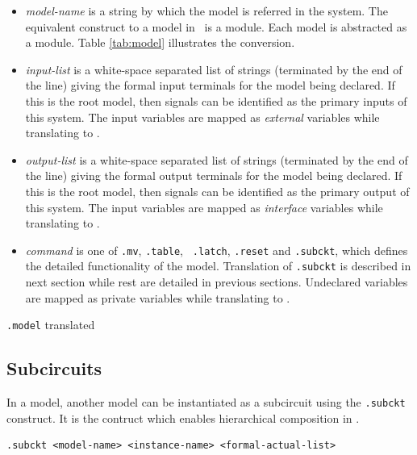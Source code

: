 \begin{itemize}
\item {\em model-name} is a string by which the model is referred
in the system. The equivalent construct to a model in \rm \ is a
module. Each model is abstracted as a module. Table
\ref{tab:model} illustrates the conversion.

\item {\em input-list} is a white-space separated list of strings
(terminated by the end of the line) giving the formal input
terminals for the model being declared. If this is the root model,
then signals can be identified as the primary inputs of this
system. The input variables are mapped as  \emph{external}
variables while translating to {\rm }.

\item {\em output-list} is a white-space separated list of strings
(terminated by the end of the line) giving the formal output
terminals for the model being declared. If this is the root model,
then signals can be identified as the primary output of this
system. The input variables are mapped as \emph{interface}
variables while translating to {\rm }.

\item {\em command} is one of {\tt .mv}, {\tt .table}, {\tt
.latch}, {\tt .reset} and {\tt .subckt}, which defines the
detailed functionality of the model. Translation of {\tt .subckt}
is described in next section while rest are detailed in previous
sections. Undeclared variables are mapped as private variables
while translating to {\rm  }.
\end{itemize}

\begin{table}

\hspace{3em}

\caption{{\tt .model} translated} \label{tab:model}
\end{table}


\subsection{Subcircuits}
In a model, another model can be instantiated as a subcircuit
using the {\tt .subckt} construct. It is the contruct which
enables hierarchical composition in {\mv}.

\begin{verbatim}
.subckt <model-name> <instance-name> <formal-actual-list>
\end{verbatim}

